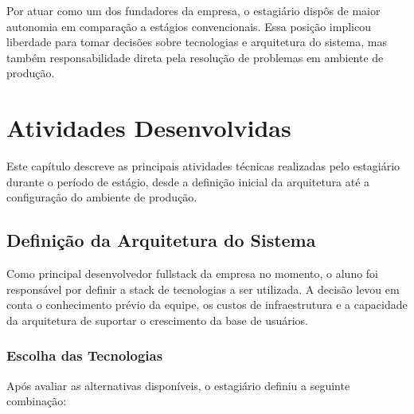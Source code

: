 \documentclass[
	12pt,
	oneside,
	a4paper,
	brazil,
	sumario=tradicional
]{abntex2}
\begin{document}
Por atuar como um dos fundadores da empresa, o estagiário dispôs de maior autonomia em comparação a estágios convencionais. Essa posição implicou liberdade para tomar decisões sobre tecnologias e arquitetura do sistema, mas também responsabilidade direta pela resolução de problemas em ambiente de produção.

\chapter{Atividades Desenvolvidas}

Este capítulo descreve as principais atividades técnicas realizadas pelo estagiário durante o período de estágio, desde a definição inicial da arquitetura até a configuração do ambiente de produção.

\section{Definição da Arquitetura do Sistema}

Como principal desenvolvedor fullstack da empresa no momento, o aluno foi responsável por definir a stack de tecnologias a ser utilizada. A decisão levou em conta o conhecimento prévio da equipe, os custos de infraestrutura e a capacidade da arquitetura de suportar o crescimento da base de usuários.

\subsection{Escolha das Tecnologias}

Após avaliar as alternativas disponíveis, o estagiário definiu a seguinte combinação:
\end{document}
